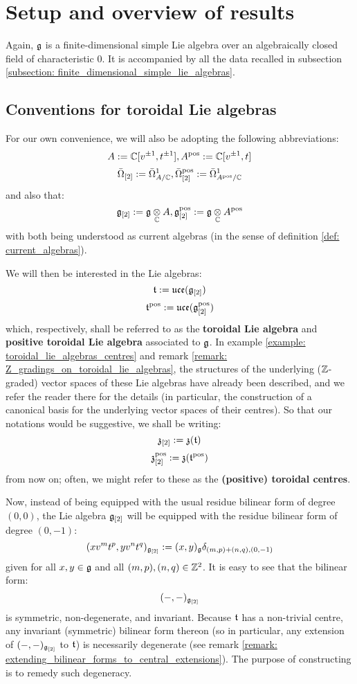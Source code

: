 \section{Setup and overview of results}
    Again, $\mathfrak{g}$ is a finite-dimensional simple Lie algebra over an algebraically closed field of characteristic $0$. It is accompanied by all the data recalled in subsection \ref{subsection: finite_dimensional_simple_lie_algebras}. 

    \subsection{Conventions for toroidal Lie algebras} \label{subsection: toroidal_lie_algebra_conventions}
        For our own convenience, we will also be adopting the following abbreviations:
            $$A := \mathbb{C}[v^{\pm 1}, t^{\pm 1}], A^{\mathrm{pos}} := \mathbb{C}[v^{\pm 1}, t]$$
            $$\bar{\Omega}_{[2]} := \bar{\Omega}^1_{A/\mathbb{C}}, \bar{\Omega}_{[2]}^{\mathrm{pos}} := \bar{\Omega}^1_{A^{\mathrm{pos}}/\mathbb{C}}$$
        and also that:
            $$\g_{[2]} := \g \tensor_{\bbC} A, \g_{[2]}^{\positive} := \g \tensor_{\bbC} A^{\positive}$$
        with both being understood as current algebras (in the sense of definition \ref{def: current_algebras}).
    
        We will then be interested in the Lie algebras:
            $$\mathfrak{t} := \mathfrak{uce}(\mathfrak{g}_{[2]})$$
            $$\mathfrak{t}^{\mathrm{pos}} := \mathfrak{uce}(\mathfrak{g}_{[2]}^{\mathrm{pos}})$$
        which, respectively, shall be referred to as the \textbf{toroidal Lie algebra} and \textbf{positive toroidal Lie algebra} associated to $\mathfrak{g}$. In example \ref{example: toroidal_lie_algebras_centres} and remark \ref{remark: Z_gradings_on_toroidal_lie_algebras}, the structures of the underlying ($\mathbb{Z}$-graded) vector spaces of these Lie algebras have already been described, and we refer the reader there for the details (in particular, the construction of a canonical basis for the underlying vector spaces of their centres). So that our notations would be suggestive, we shall be writing:
            $$\mathfrak{z}_{[2]} := \mathfrak{z}(\mathfrak{t})$$
            $$\mathfrak{z}_{[2]}^{\mathrm{pos}} := \mathfrak{z}(\mathfrak{t}^{\mathrm{pos}})$$
        from now on; often, we might refer to these as the \textbf{(positive) toroidal centres}.
        
        Now, instead of being equipped with the usual residue bilinear form of degree $(0, 0)$, the Lie algebra $\mathfrak{g}_{[2]}$ will be equipped with the residue bilinear form of degree $(0, -1)$:
            $$(x v^m t^p, y v^n t^q)_{\mathfrak{g}_{[2]}} := (x, y)_{\mathfrak{g}} \delta_{(m, p) + (n, q), (0, -1)}$$
        given for all $x, y \in \mathfrak{g}$ and all $(m, p), (n, q) \in \mathbb{Z}^2$. It is easy to see that the bilinear form:
            $$(-, -)_{\mathfrak{g}_{[2]}}$$
        is symmetric, non-degenerate, and invariant. Because $\mathfrak{t}$ has a non-trivial centre, any invariant (symmetric) bilinear form thereon (so in particular, any extension of $(-, -)_{\mathfrak{g}_{[2]}}$ to $\mathfrak{t}$) is necessarily degenerate (see remark \ref{remark: extending_bilinear_forms_to_central_extensions}). The purpose of constructing  is to remedy such degeneracy.

